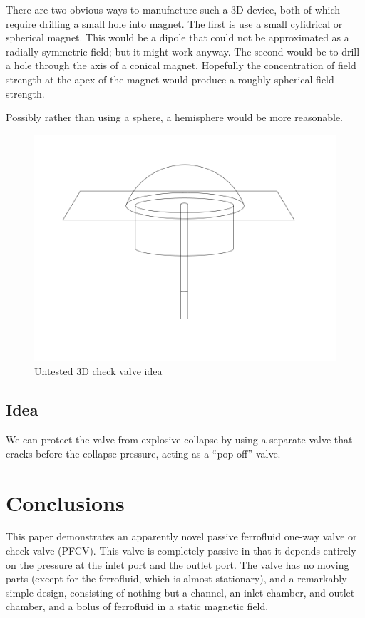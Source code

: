 \documentclass{asme2ej}
\begin{document}
There are two obvious ways to manufacture such a 3D device, both of which require
drilling a small hole into magnet. The first is use a small cylidrical or spherical
magnet. This would be a dipole that could not be approximated as a radially
symmetric field; but it might work anyway.  The second would be to drill a hole
through the axis of a conical magnet. Hopefully the concentration of field strength
at the apex of the magnet would produce a roughly spherical field strength.

Possibly rather than using a sphere, a hemisphere would be more reasonable.

\begin{figure}
\centerline{\includegraphics[width=6in]{figure/3DCheckValve.png}}
\caption{Untested 3D check valve idea}
\label{fig:3dcheckvalve}
\end{figure}

\subsection{Idea}

We can protect the valve from explosive collapse by using a separate
valve that cracks before the collapse pressure, acting as a ``pop-off''
valve.





\section{Conclusions}

This paper demonstrates an apparently novel passive ferrofluid one-way
valve or check valve (PFCV). This valve is completely passive in that
it depends entirely on the pressure at the inlet port and the outlet
port. The valve has no moving parts (except for the ferrofluid, which
is almost stationary), and a remarkably simple design, consisting of
nothing but a channel, an inlet chamber, and outlet chamber,
and a bolus of ferrofluid in a
static magnetic field.
\end{document}
